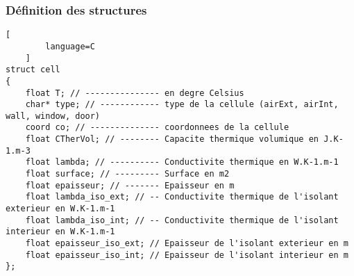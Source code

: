 \documentclass{beamer}
\begin{document}
\begin{frame}[fragile]
    \frametitle{Définition des structures}

    \begin{lstlisting}[
        language=C
    ]
struct cell
{
    float T; // --------------- en degre Celsius
    char* type; // ------------ type de la cellule (airExt, airInt, wall, window, door)
    coord co; // -------------- coordonnees de la cellule
    float CTherVol; // -------- Capacite thermique volumique en J.K-1.m-3
    float lambda; // ---------- Conductivite thermique en W.K-1.m-1
    float surface; // --------- Surface en m2
    float epaisseur; // ------- Epaisseur en m
    float lambda_iso_ext; // -- Conductivite thermique de l'isolant exterieur en W.K-1.m-1
    float lambda_iso_int; // -- Conductivite thermique de l'isolant interieur en W.K-1.m-1
    float epaisseur_iso_ext; // Epaisseur de l'isolant exterieur en m
    float epaisseur_iso_int; // Epaisseur de l'isolant interieur en m
};
    \end{lstlisting}

\end{frame}
\end{document}
